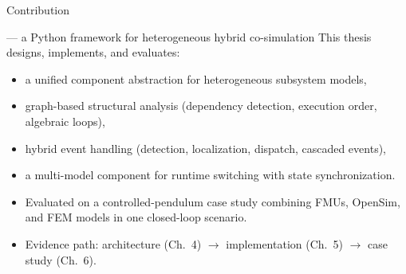 \begin{frame}{Contribution}
\begin{block}{\syssimx{} --- a Python framework for heterogeneous hybrid co-simulation}
This thesis designs, implements, and evaluates:
\begin{itemize}
    \item a unified component abstraction for heterogeneous subsystem models,
    \item graph-based structural analysis (dependency detection, execution order, algebraic loops),
    \item hybrid event handling (detection, localization, dispatch, cascaded events),
    \item a multi-model component for runtime switching with state synchronization.
\end{itemize}
\end{block}

\begin{itemize}
    \item Evaluated on a controlled-pendulum case study combining \acp{FMU}, OpenSim, and \ac{FEM} models in one closed-loop scenario.
    \item Evidence path: architecture (Ch.~4) $\to$ implementation (Ch.~5) $\to$ case study (Ch.~6).
\end{itemize}
\end{frame}